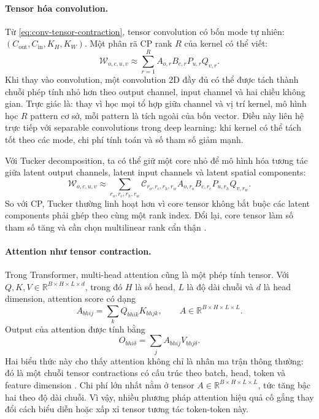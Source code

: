 \paragraph{Tensor hóa convolution.}
Từ \eqref{eq:conv-tensor-contraction}, tensor convolution có bốn mode tự nhiên:
$(C_{\mathrm{out}}, C_{\mathrm{in}}, K_H, K_W)$. Một phân rã CP rank $R$ của kernel có
thể viết:
\begin{equation}
    \mathcal{W}_{o,c,u,v}
    \approx
    \sum_{r=1}^{R}
    A_{o,r} B_{c,r} P_{u,r} Q_{v,r}.
    \label{eq:cp-conv-kernel}
\end{equation}
Khi thay vào convolution, một convolution 2D đầy đủ có thể được tách thành chuỗi phép
tính nhỏ hơn theo output channel, input channel và hai chiều không gian. Trực giác là:
thay vì học mọi tổ hợp giữa channel và vị trí kernel, mô hình học $R$ pattern cơ sở,
mỗi pattern là tích ngoài của bốn vector. Điều này liên hệ trực tiếp với separable
convolutions trong deep learning: khi kernel có thể tách tốt theo các mode, chi phí
tính toán và số tham số giảm mạnh.

Với Tucker decomposition, ta có thể giữ một core nhỏ để mô hình hóa tương tác giữa
latent output channels, latent input channels và latent spatial components:
\begin{equation}
    \mathcal{W}_{o,c,u,v}
    \approx
    \sum_{r_o,r_c,r_h,r_w}
    \mathcal{C}_{r_o,r_c,r_h,r_w}
    A_{o,r_o}B_{c,r_c}P_{u,r_h}Q_{v,r_w}.
    \label{eq:tucker-conv-kernel}
\end{equation}
So với CP, Tucker thường linh hoạt hơn vì core tensor không bắt buộc các latent
components phải ghép theo cùng một rank index. Đổi lại, core tensor làm số tham số tăng
và cần chọn multilinear rank cẩn thận \cite{panagakis2021tensor}.

\paragraph{Attention như tensor contraction.}
Trong Transformer, multi-head attention cũng là một phép tính tensor. Với
$Q,K,V \in \mathbb{R}^{B \times H \times L \times d}$, trong đó $H$ là số head,
$L$ là độ dài chuỗi và $d$ là head dimension, attention score có dạng
\begin{equation}
    A_{bhij} = \sum_k Q_{bhik}K_{bhjk},
    \qquad
    A \in \mathbb{R}^{B \times H \times L \times L}.
    \label{eq:attention-score-tensor}
\end{equation}
Output của attention được tính bằng
\begin{equation}
    O_{bhi\delta} = \sum_j A_{bhij}V_{bhj\delta}.
    \label{eq:attention-output-tensor}
\end{equation}
Hai biểu thức này cho thấy attention không chỉ là nhân ma trận thông thường: đó là một
chuỗi tensor contractions có cấu trúc theo batch, head, token và feature dimension
\cite{vaswani2017attention}. Chi phí lớn nhất nằm ở tensor
$A \in \mathbb{R}^{B \times H \times L \times L}$, tức tăng bậc hai theo độ dài chuỗi.
Vì vậy, nhiều phương pháp attention hiệu quả cố gắng thay đổi cách biểu diễn hoặc xấp
xỉ tensor tương tác token-token này.


